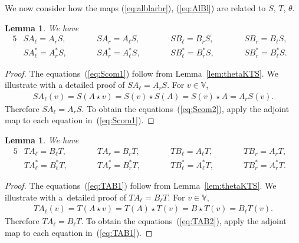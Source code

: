 \documentclass[pdftex]{sigma}
\numberwithin{equation}{section}
\newtheorem{Lemma}[Theorem]{Lemma}
\begin{document}
We now consider how the maps (\ref{eq:alblarbr}), (\ref{eq:AlBl}) are related to $S$, $T$, $\theta$.
\begin{Lemma}\label{lem:SAB}
We have
\begin{alignat}{5}
& S A_\ell = A_r S, \qquad&&
 S A_r = A_\ell S, \qquad&&
 S B_\ell = B_r S, \qquad&&
 S B_r = B_\ell S,&\label{eq:Scom1}\\
& S A^*_\ell = A^*_r S, \qquad &&
 S A^*_r = A^*_\ell S, \qquad &&
 S B^*_\ell = B^*_r S, \qquad &&
 S B^*_r = B^*_\ell S.&\label{eq:Scom2}
\end{alignat}
\end{Lemma}
\begin{proof} The equations~(\ref{eq:Scom1}) follow from Lemma~\ref{lem:thetaKTS}. We illustrate with a detailed proof of
$S A_{\ell} = A_r S$. For $v \in \mathbb V$,
\begin{gather*}
S A_{\ell}(v) = S(A \star v) = S(v)\star S(A) = S(v) \star A = A_r S(v).
\end{gather*}
Therefore $S A_{\ell} = A_r S$. To obtain the equations~(\ref{eq:Scom2}), apply the adjoint map to each equation in~(\ref{eq:Scom1}).
\end{proof}

\begin{Lemma}\label{lem:TAB} We have
\begin{alignat}{5}
\label{eq:TAB1}
& T A_\ell = B_\ell T, \qquad &&
 T A_r = B_r T, \qquad &&
 T B_\ell = A_\ell T, \qquad &&
 T B_r = A_r T,&\\
\label{eq:TAB2}
& T A^*_\ell = B^*_\ell T, \qquad &&
 T A^*_r = B^*_r T, \qquad &&
 T B^*_\ell = A^*_\ell T, \qquad &&
 T B^*_r = A^*_r T.
\end{alignat}
\end{Lemma}
\begin{proof} The equations~(\ref{eq:TAB1}) follow from Lemma~\ref{lem:thetaKTS}. We illustrate with a~detailed proof of $T A_\ell = B_\ell T$. For $v \in \mathbb V$,
\begin{gather*}
T A_\ell (v) =
T(A \star v) =
T(A) \star T(v) =
B \star T(v) =
B_\ell T (v).
\end{gather*}
Therefore
$T A_\ell = B_\ell T$. To obtain the equations~(\ref{eq:TAB2}), apply the adjoint map to each equation in~(\ref{eq:TAB1}).
\end{proof}
\end{document}
